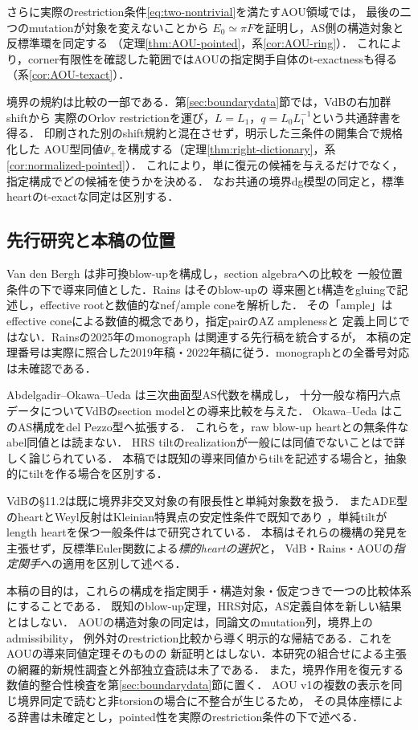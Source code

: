 さらに実際のrestriction条件\eqref{eq:two-nontrivial}を満たすAOU領域では，
最後の二つのmutationが対象を変えないことから
$E_0\simeq\pi F$を証明し，AS側の構造対象と反標準環を同定する
（定理\ref{thm:AOU-pointed}，系\ref{cor:AOU-ring}）．
これにより，corner有限性を確認した範囲ではAOUの指定関手自体のt-exactnessも得る
（系\ref{cor:AOU-texact}）．

境界の規約は比較の一部である．第\ref{sec:boundarydata}節では，VdBの右加群shiftから
実際のOrlov restrictionを運び，$L=L_1$，$q=L_0L_1^{-1}$という共通辞書を得る．
印刷された別のshift規約と混在させず，明示した三条件の開集合で規格化した
AOU型同値$\Psi_+$を構成する（定理\ref{thm:right-dictionary}，系\ref{cor:normalized-pointed}）．
これにより，単に復元の候補を与えるだけでなく，指定構成でどの候補を使うかを決める．
なお共通の境界dg模型の同定と，標準heartのt-exactな同定は区別する．

\subsection{先行研究と本稿の位置}
Van den Bergh \cite{VdB}は非可換blow-upを構成し，section algebraへの比較を
一般位置条件の下で導来同値とした．Rains \cite{Rains,Filtered}はそのblow-upの
導来圏とt構造をgluingで記述し，effective rootと数値的なnef/ample coneを解析した．
その「ample」はeffective coneによる数値的概念であり，指定pairのAZ amplenessと
定義上同じではない．Rainsの2025年のmonograph \cite{RainsBook}は関連する先行稿を統合するが，
本稿の定理番号は実際に照合した2019年稿・2022年稿に従う．monographとの全番号対応は未確認である．

Abdelgadir--Okawa--Ueda \cite{AOU}は三次曲面型AS代数を構成し，
十分一般な楕円六点データについてVdBのsection modelとの導来比較を与えた．
Okawa--Ueda \cite{OU}はこのAS構成をdel Pezzo型へ拡張する．
これらを，raw blow-up heartとの無条件なabel同値とは読まない．
HRS tiltのrealizationが一般には同値でないことは\cite{CHZ}で詳しく論じられている．
本稿では既知の導来同値からtiltを記述する場合と，抽象的にtiltを作る場合を区別する．

VdBの\S11.2は既に境界非交叉対象の有限長性と単純対象数を扱う．
またADE型のheartとWeyl反射はKleinian特異点の安定性条件で既知であり
\cite{BridgelandKleinian}，単純tiltがlength heartを保つ一般条件は\cite{BCPW}で研究されている．
本稿はそれらの機構の発見を主張せず，反標準Euler関数による\emph{標的heartの選択}と，
VdB・Rains・AOUの\emph{指定関手}への適用を区別して述べる．

本稿の目的は，これらの構成を指定関手・構造対象・仮定つきで一つの比較体系にすることである．
既知のblow-up定理，HRS対応，AS定義自体を新しい結果とはしない．
AOUの構造対象の同定は，同論文のmutation列，境界上のadmissibility，
例外対のrestriction比較から導く明示的な帰結である．これをAOUの導来同値定理そのものの
新証明とはしない．本研究の組合せによる主張の網羅的新規性調査と外部独立査読は未了である．
また，境界作用を復元する数値的整合性検査を第\ref{sec:boundarydata}節に置く．
AOU v1の複数の表示を同じ境界同定で読むと非torsionの場合に不整合が生じるため，
その具体座標による辞書は未確定とし，pointed性を実際のrestriction条件の下で述べる．

